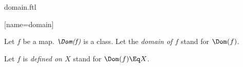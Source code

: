 \documentclass{stex}
\begin{document}
\begin{smodule}{domain.ftl}


[name=domain]{}


\begin{fakeforthel}
  \begin{signature}[for=Dom]
    Let $f$ be a map.
    $\emph{\Dom(f)}$ is a class.
    Let the \emph{domain of $f$} stand for $\Dom(f)$.
  \end{signature}
\end{fakeforthel}

\begin{forthel}
  \begin{convention}[for=defined]
    Let $f$ is \emph{defined on $X$} stand for $\Dom(f) \Eq X$.
  \end{convention}
\end{forthel}

\end{smodule}
\end{document}
